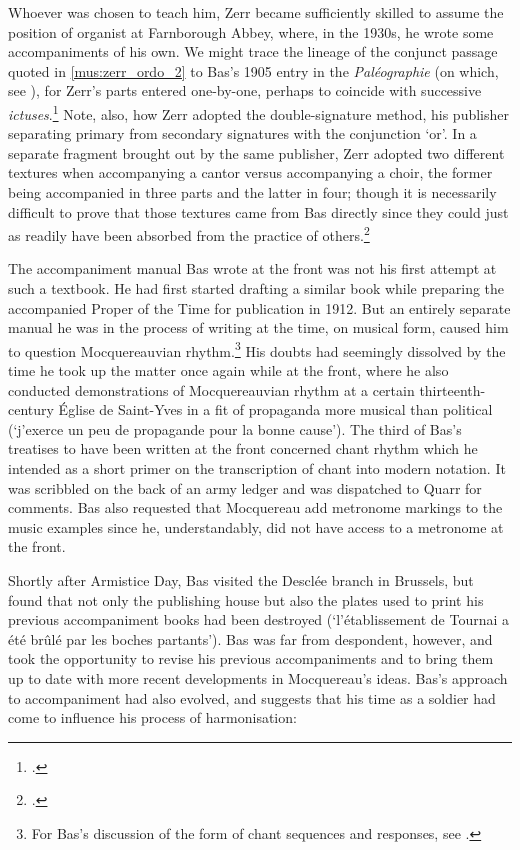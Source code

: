 Whoever was chosen to teach him, Zerr became sufficiently skilled to assume the position of organist at Farnborough Abbey, where, in the 1930s, he wrote some accompaniments of his own.
We might trace the lineage of the conjunct passage quoted in \cref{mus:zerr_ordo_2} to Bas's 1905 entry in the \emph{Paléographie} (on which, see ), for Zerr's parts entered one-by-one, perhaps to coincide with successive \emph{ictuses}.\footcite[2]{ZerrOrdoadrecipiendum1937}
Note, also, how Zerr adopted the double-signature method, his publisher separating primary from secondary signatures with the conjunction `or'.
In a separate fragment brought out by the same publisher, Zerr adopted two different textures when accompanying a cantor versus accompanying a choir, the former being accompanied in three parts and the latter in four; though it is necessarily difficult to prove that those textures came from Bas directly since they could just as readily have been absorbed from the practice of others.\footcite[1]{ZerrMissaOrbisfactor1936}

The accompaniment manual Bas wrote at the front was not his first attempt at such a textbook.
He had first started drafting a similar book while preparing the accompanied Proper of the Time for publication in 1912.
But an entirely separate manual he was in the process of writing at the time, on musical form, caused him to question Mocquereauvian rhythm.\footnote{For Bas's discussion of the form of chant sequences and responses, see \cite[133--5]{BasTrattatodiforma}.}
His doubts had seemingly dissolved by the time he took up the matter once again while at the front, where he also conducted demonstrations of Mocquereauvian rhythm at a certain thirteenth-century Église de Saint-Yves in a fit of propaganda more musical than political (`j'exerce un peu de propagande pour la bonne cause').
The third of Bas's treatises to have been written at the front concerned chant rhythm which he intended as a short primer on the transcription of chant into modern notation.
It was scribbled on the back of an army ledger and was dispatched to Quarr for comments.
Bas also requested that Mocquereau add metronome markings to the music examples since he, understandably, did not have access to a metronome at the front.

Shortly after Armistice Day, Bas visited the Desclée branch in Brussels, but found that not only the publishing house but also the plates used to print his previous accompaniment books had been destroyed (`l'établissement de Tournai a été brûlé par les boches partants').
Bas was far from despondent, however, and took the opportunity to revise his previous accompaniments and to bring them up to date with more recent developments in Mocquereau's ideas.
Bas's approach to accompaniment had also evolved, and suggests that his time as a soldier had come to influence his process of harmonisation:


